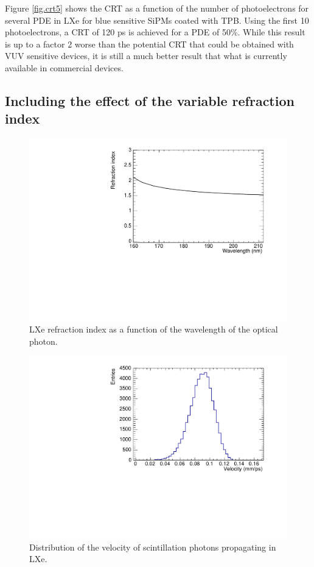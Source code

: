 \documentclass[review]{elsarticle}
\begin{document}
Figure \ref{fig.crt5} shows the CRT as a function of the number of photoelectrons for several PDE in LXe for blue sensitive SiPMs coated with TPB. Using the first 10 photoelectrons, a CRT of 120 ps is achieved for a  PDE of 50\%. While this result is up to a factor 2 worse than the potential CRT that could be obtained with VUV sensitive devices, it is still a much better result that what is currently available in commercial devices.      

\subsection*{Including the effect of the variable refraction index}

\begin{figure}[!bhtp]
	\centering
	\includegraphics[scale=0.5]{../img/LXe_n_lambda.pdf}
	\caption{\label{fig.nlambda} LXe refraction index as a function of the wavelength of the optical photon.}
\end{figure}

\begin{figure}[!bhtp]
	\centering
	\includegraphics[scale=0.5]{../img/VelocityDistrLXe.pdf}
	\caption{\label{fig.vLXe} Distribution of the velocity of scintillation photons propagating in LXe.}
\end{figure}
\end{document}
